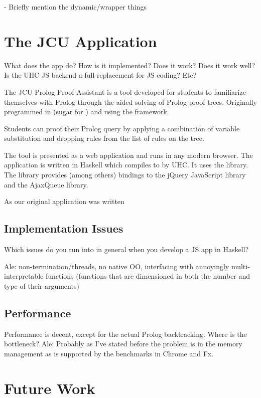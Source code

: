 \documentclass{llncs}
\begin{document}
- Briefly mention the dynamic/wrapper things

\section{The JCU Application}

\label{jcu}
What does the app do? How is it implemented? Does it work? Does it work well?
Is the UHC JS backend a full replacement for JS coding? Etc?
\cite{swierstra2011,stutterheim2012} \cite{snap}

The JCU Prolog Proof Assistant\cite{swierstra2011} is a tool developed for
students to familiarize themselves with Prolog through the aided solving of
Prolog proof trees. Originally programmed in \coffeescript\cite{coffeescript}
(sugar for \js) and using the \brunch\cite{brunch} framework.

Students can proof their Prolog query by applying a combination of variable
substitution and dropping rules from the list of rules on the tree.

The tool is presented as a web application and runs in any modern browser. The
application is written in Haskell which compiles to \js by UHC. It uses the
\uhcjscript\cite{uhcjs} library. The \uhcjscript library provides (among others)
bindings to the jQuery\cite{jquery} JavaScript library and the
AjaxQueue\cite{ajaxq} library.

As our original application was written


\subsection{\label{issues}Implementation Issues}
Which issues do you run into in general when you develop a JS app in Haskell?

Ale: non-termination/threads, no native OO, interfacing with annoyingly
multi-interpretable functions (functions that are dimensioned in both the number
and type of their arguments)

\subsection{\label{performance}Performance}
Performance is decent, except for the actual Prolog backtracking. Where is the bottleneck?
Ale: Probably as I've stated before the problem is in the memory management as
is supported by the benchmarks in Chrome and Fx.

\section{Future Work}
\end{document}
